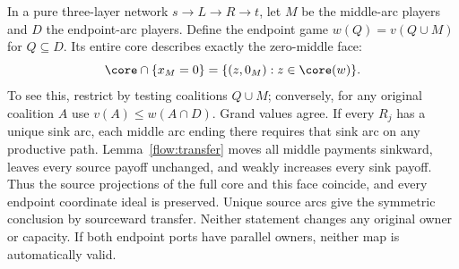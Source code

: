In a pure three-layer network $s\to L\to R\to t$, let $M$ be the
middle-arc players and $D$ the endpoint-arc players. Define the endpoint
game $w(Q)=v(Q\cup M)$ for $Q\subseteq D$. Its entire core describes
exactly the zero-middle face:
\begin{equation}\label{flow:face}
 \core\cap\{x_M=0\}=\{(z,0_M):z\in\core(w)\}.
\end{equation}
To see this, restrict by testing coalitions $Q\cup M$; conversely, for
any original coalition $A$ use
$v(A)\le w(A\cap D)$. Grand values agree. If every $R_j$ has a unique
sink arc, each middle arc ending there requires that sink arc on any
productive path. Lemma~\ref{flow:transfer} moves all middle payments
sinkward, leaves every source payoff unchanged, and weakly increases
every sink payoff. Thus the source projections of the full core and
this face coincide, and every endpoint coordinate ideal is preserved.
Unique source arcs give the symmetric conclusion by sourceward transfer.
Neither statement changes any original owner or capacity. If both
endpoint ports have parallel owners, neither map is automatically valid.

